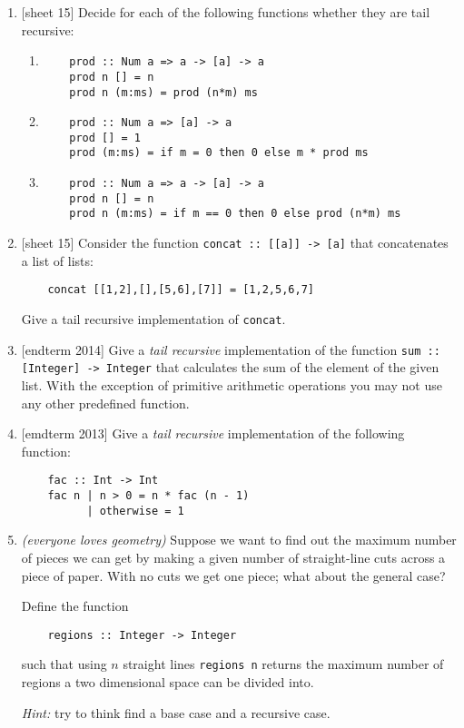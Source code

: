 \documentclass{article}
\begin{document}
\begin{enumerate}
\item {[sheet 15]} Decide for each of the following functions whether they are tail recursive:
\begin{enumerate}
\item \begin{verbatim}
    prod :: Num a => a -> [a] -> a
    prod n [] = n
    prod n (m:ms) = prod (n*m) ms
\end{verbatim}
\item \begin{verbatim}
    prod :: Num a => [a] -> a
    prod [] = 1
    prod (m:ms) = if m = 0 then 0 else m * prod ms
\end{verbatim}
\item \begin{verbatim}
    prod :: Num a => a -> [a] -> a
    prod n [] = n
    prod n (m:ms) = if m == 0 then 0 else prod (n*m) ms
\end{verbatim}
\end{enumerate}

\item {[sheet 15]} Consider the function \verb|concat :: [[a]] -> [a]| that concatenates a list of lists:
\begin{verbatim}
    concat [[1,2],[],[5,6],[7]] = [1,2,5,6,7]
\end{verbatim}
Give a tail recursive implementation of \verb|concat|.

\item {[endterm 2014]} Give a \textit{tail recursive} implementation of the function \verb|sum :: [Integer] -> Integer| that calculates the sum of the element of the given list. With the exception of primitive arithmetic operations you may not use any other predefined function.

\item {[emdterm 2013]} Give a \textit{tail recursive} implementation of the following function:
\begin{verbatim}
    fac :: Int -> Int
    fac n | n > 0 = n * fac (n - 1)
          | otherwise = 1
\end{verbatim}

\item \cite[p. 85]{thompson} \textit{(everyone loves geometry)} Suppose we want to find out the maximum number of pieces we can get by making a given number of straight-line cuts across a piece of paper. With no cuts we get one piece; what about the general case? \par
Define the function
\begin{verbatim}
    regions :: Integer -> Integer
\end{verbatim}
such that using $n$ straight lines \verb|regions n| returns the maximum number of regions a two dimensional space can be divided into. \par
\textit{Hint:} try to think find a base case and a recursive case.
\end{enumerate}
\end{document}
